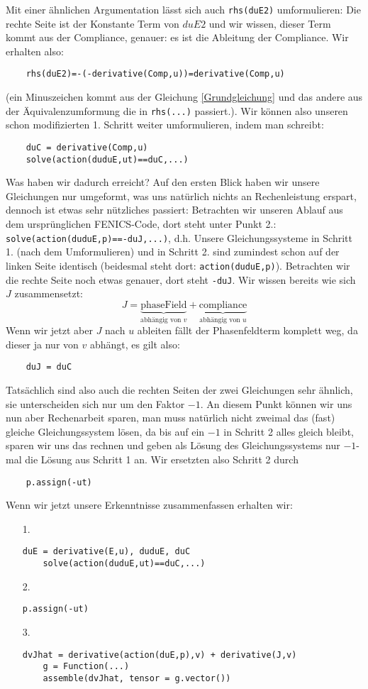 \documentclass[a4paper, 12pt]{scrartcl}
\begin{document}
Mit einer ähnlichen Argumentation lässt sich auch \verb|rhs(duE2)| umformulieren: Die rechte Seite ist der Konstante Term von $duE2$ und wir wissen, dieser Term kommt aus der Compliance, genauer: es ist die Ableitung der Compliance. Wir erhalten also:
\begin{verbatim}
	rhs(duE2)=-(-derivative(Comp,u))=derivative(Comp,u)
\end{verbatim}	
(ein Minuszeichen kommt aus der Gleichung \ref{Grundgleichung} und das andere aus der Äquivalenzumformung die in \verb|rhs(...)| passiert.). Wir können also unseren schon modifizierten 1. Schritt weiter umformulieren, indem man schreibt:
\begin{verbatim}
	duC = derivative(Comp,u)
	solve(action(duduE,ut)==duC,...)
\end{verbatim}
Was haben wir dadurch erreicht? Auf den ersten Blick haben wir unsere Gleichungen nur umgeformt, was uns natürlich nichts an Rechenleistung erspart, dennoch ist etwas sehr nützliches passiert: Betrachten wir unseren Ablauf aus dem ursprünglichen FENICS-Code, dort steht unter Punkt 2.: \verb|solve(action(duduE,p)==-duJ,...)|, d.h. Unsere Gleichungssysteme in Schritt 1. (nach dem Umformulieren) und in Schritt 2. sind zumindest schon auf der linken Seite identisch (beidesmal steht dort: \verb|action(duduE,p)|). Betrachten wir die rechte Seite noch etwas genauer, dort steht \verb|-duJ|. Wir wissen bereits wie sich $J$ zusammensetzt:
\[
	J = \underbrace{\text{phaseField}}_{\text{abhängig von }v} + \underbrace{\text{compliance}}_{\text{abhängig von }u}
\]
Wenn wir jetzt aber $J$ nach $u$ ableiten fällt der Phasenfeldterm komplett weg, da dieser ja nur von $v$ abhängt, es gilt also:
\begin{verbatim}
	duJ = duC
\end{verbatim}
Tatsächlich sind also auch die rechten Seiten der zwei Gleichungen sehr ähnlich, sie unterscheiden sich nur um den Faktor $-1$. An diesem Punkt können wir uns nun aber Rechenarbeit sparen, man muss natürlich nicht zweimal das (fast) gleiche Gleichungssystem lösen, da bis auf ein $-1$ in Schritt 2 alles gleich bleibt, sparen wir uns das rechnen und geben als Lösung des Gleichungssystems nur $-1$-mal die Lösung aus Schritt 1 an. Wir ersetzten also Schritt 2 durch
\begin{verbatim}
	p.assign(-ut)
\end{verbatim}
Wenn wir jetzt unsere Erkenntnisse zusammenfassen erhalten wir:
\begin{itemize}
	\item [1.] \begin{verbatim}duE = derivative(E,u), duduE, duC
	solve(action(duduE,ut)==duC,...) \end{verbatim}
	\item [2.] \begin{verbatim}p.assign(-ut) \end{verbatim}
	\item [3.] \begin{verbatim}dvJhat = derivative(action(duE,p),v) + derivative(J,v)
	g = Function(...)
	assemble(dvJhat, tensor = g.vector())\end{verbatim}
\end{itemize}
\end{document}
